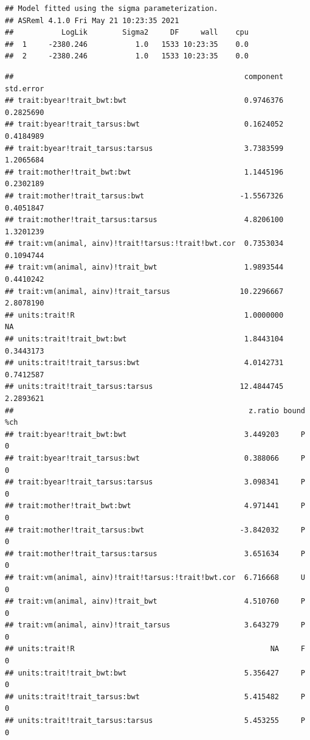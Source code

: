 \documentclass[
  12pt,
]{book}
\newenvironment{Shaded}{\begin{snugshade}}{\end{snugshade}}
\newcommand{\FunctionTok}[1]{\textcolor[rgb]{0.00,0.00,0.00}{#1}}
\newcommand{\NormalTok}[1]{#1}
\newcommand{\SpecialCharTok}[1]{\textcolor[rgb]{0.00,0.00,0.00}{#1}}
\begin{document}
\begin{verbatim}
## Model fitted using the sigma parameterization.
## ASReml 4.1.0 Fri May 21 10:23:35 2021
##           LogLik        Sigma2     DF     wall    cpu
##  1     -2380.246           1.0   1533 10:23:35    0.0
##  2     -2380.246           1.0   1533 10:23:35    0.0
\end{verbatim}

\begin{Shaded}
\end{Shaded}

\begin{verbatim}
##                                                     component std.error
## trait:byear!trait_bwt:bwt                           0.9746376 0.2825690
## trait:byear!trait_tarsus:bwt                        0.1624052 0.4184989
## trait:byear!trait_tarsus:tarsus                     3.7383599 1.2065684
## trait:mother!trait_bwt:bwt                          1.1445196 0.2302189
## trait:mother!trait_tarsus:bwt                      -1.5567326 0.4051847
## trait:mother!trait_tarsus:tarsus                    4.8206100 1.3201239
## trait:vm(animal, ainv)!trait!tarsus:!trait!bwt.cor  0.7353034 0.1094744
## trait:vm(animal, ainv)!trait_bwt                    1.9893544 0.4410242
## trait:vm(animal, ainv)!trait_tarsus                10.2296667 2.8078190
## units:trait!R                                       1.0000000        NA
## units:trait!trait_bwt:bwt                           1.8443104 0.3443173
## units:trait!trait_tarsus:bwt                        4.0142731 0.7412587
## units:trait!trait_tarsus:tarsus                    12.4844745 2.2893621
##                                                      z.ratio bound %ch
## trait:byear!trait_bwt:bwt                           3.449203     P   0
## trait:byear!trait_tarsus:bwt                        0.388066     P   0
## trait:byear!trait_tarsus:tarsus                     3.098341     P   0
## trait:mother!trait_bwt:bwt                          4.971441     P   0
## trait:mother!trait_tarsus:bwt                      -3.842032     P   0
## trait:mother!trait_tarsus:tarsus                    3.651634     P   0
## trait:vm(animal, ainv)!trait!tarsus:!trait!bwt.cor  6.716668     U   0
## trait:vm(animal, ainv)!trait_bwt                    4.510760     P   0
## trait:vm(animal, ainv)!trait_tarsus                 3.643279     P   0
## units:trait!R                                             NA     F   0
## units:trait!trait_bwt:bwt                           5.356427     P   0
## units:trait!trait_tarsus:bwt                        5.415482     P   0
## units:trait!trait_tarsus:tarsus                     5.453255     P   0
\end{verbatim}
\end{document}
